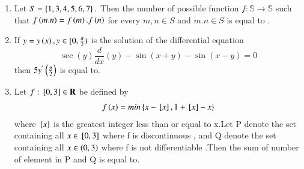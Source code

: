 \documentclass[journal]{IEEEtran}
\begin{document}
\begin{enumerate}[start=16]
\item  Let $S = \left\{1,3,4,5,6,7\right\}.$ Then the number of possible function $f:\mathbb{S}\to \mathbb{S}$ such that $f\left(m.n\right)=f\left(m\right).f\left(n\right)$ for every $m,n\in S$ and $m.n\in S$ is equal to .\bigskip
\item If $y=y\left(x\right),y \in [0,\frac{\pi}{2})$ is the solution of the differential equation \[
\sec(y) \frac{d}{dx}(y) - \sin(x + y) - \sin(x - y) = 0\] then $5y^{'}\left(\frac{\pi}{2}\right)$ is equal to.
\bigskip
\item Let $f:{}\left[0,3\right]\in \mathbf{R}$ be defined by
\begin{align*}
f\left(x\right)=min\left\{x-{}\left[x\right],1+{}\left[x\right]-x\right\}
\end{align*}
where ${}\left[x\right]$ is the greatest integer less than or equal to x.Let P denote the set containing all $x\in{}\left[0,3\right]$ where f is discontinuous , and Q denote the set containing all $x\in\left(0,3\right)$ where f is not differentiable .Then the sum of number of element in P and Q is equal to.
 



   

\end{enumerate}
\end{document}
